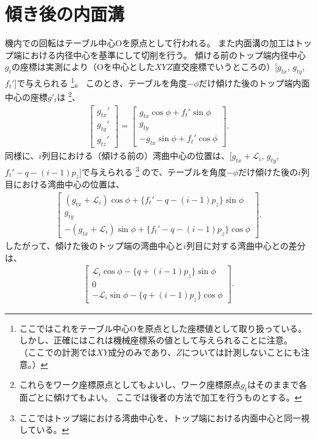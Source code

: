 \section{傾き後の内面溝}
機内での回転はテーブル中心Oを原点として行われる。
また内面溝の加工はトップ端における内径中心を基準にして切削を行う。
傾ける前のトップ端内径中心$g_t$の座標は実測により（Oを中心とした$XYZ$直交座標でいうところの）[$g_{tx}$, $g_{ty}$, $f_t'$]で与えられる
\footnote{ここではこれをテーブル中心Oを原点とした座標値として取り扱っている。
しかし、正確にはこれは機械座標系の値として与えられることに注意。
（ここでの計測では$XY$成分のみであり、$Z$については計測しないことにも注意。）}。
このとき、テーブルを角度$-\phi$だけ傾けた後のトップ端内面中心の座標$g'_t$は
\footnote{これらをワーク座標原点としてもよいし、ワーク座標原点$g_t$はそのままで各面ごとに傾けてもよい。
ここでは後者の方法で加工を行うものとする。}、
\begin{align*}
  \left[
  \begin{array}{c}
    g_{tx}'\\
    g_{ty}'\\
    g_{tz}'
  \end{array}
  \right]
  =\left[
   \begin{array}{c}
     g_{tx}\cos\phi+f_t'\sin\phi\\
     g_{ty}\\
     -g_{tx}\sin\phi+f_t'\cos\phi
   \end{array}
   \right].
\end{align*}
同様に、$i$列目における（傾ける前の）湾曲中心の位置は、[$g_{tx}+\mathcal L_i$, $g_{ty}$, $f_t'-q-(i-1)p_z$]で与えられる
\footnote{ここではトップ端における湾曲中心を、トップ端における内面中心と同一視している。}
ので、テーブルを角度$-\phi$だけ傾けた後の$i$列目における湾曲中心の位置は、
\begin{align*}
  \left[
  \begin{array}{c}
    (g_{tx}+\mathcal L_i)\cos\phi+\{f_t'-q-(i-1)p_z\}\sin\phi\\
    g_{ty}\\
    -(g_{tx}+\mathcal L_i)\sin\phi+\{f_t'-q-(i-1)p_z\}\cos\phi
  \end{array}
  \right].
\end{align*}
したがって、傾けた後のトップ端の湾曲中心と$i$列目に対する湾曲中心との差分は、
\begin{align*}
  \left[
  \begin{array}{c}
    \mathcal L_i\cos\phi-\{q+(i-1)p_z\}\sin\phi\\
    0\\
    -\mathcal L_i\sin\phi-\{q+(i-1)p_z\}\cos\phi
  \end{array}
  \right].
\end{align*}
